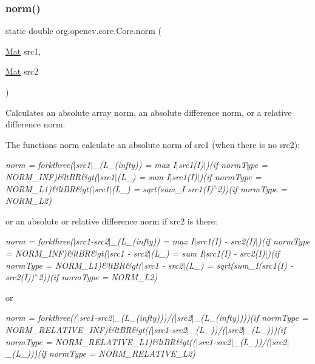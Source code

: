 \subsubsection{\texorpdfstring{norm()}{norm()}\hspace{0.1cm}{\footnotesize\ttfamily [6/6]}}
{\footnotesize\ttfamily static double org.\+opencv.\+core.\+Core.\+norm (\begin{DoxyParamCaption}\item[{\mbox{\hyperlink{classorg_1_1opencv_1_1core_1_1_mat}{Mat}}}]{src1,  }\item[{\mbox{\hyperlink{classorg_1_1opencv_1_1core_1_1_mat}{Mat}}}]{src2 }\end{DoxyParamCaption})\hspace{0.3cm}{\ttfamily [static]}}

Calculates an absolute array norm, an absolute difference norm, or a relative difference norm.

The functions {\ttfamily norm} calculate an absolute norm of {\ttfamily src1} (when there is no {\ttfamily src2})\+:

{\itshape norm = forkthree($\vert$src1$\vert$\+\_\+(L\+\_\+(infty)) = max {\itshape I$\vert$src1(I)$\vert$)(if norm\+Type = N\+O\+R\+M\+\_\+\+I\+NF)\&lt\+BR\&gt($\vert$src1$\vert$}(L\+\_) = sum {\itshape I$\vert$src1(I)$\vert$)(if norm\+Type = N\+O\+R\+M\+\_\+\+L1)\&lt\+BR\&gt($\vert$src1$\vert$}(L\+\_) = sqrt(sum\+\_\+\+I src1(\+I)$^\wedge$2))(if norm\+Type = N\+O\+R\+M\+\_\+\+L2)}

or an absolute or relative difference norm if {\ttfamily src2} is there\+:

{\itshape norm = forkthree($\vert$src1-\/src2$\vert$\+\_\+(L\+\_\+(infty)) = max {\itshape I$\vert$src1(I) -\/ src2(\+I)$\vert$)(if norm\+Type = N\+O\+R\+M\+\_\+\+I\+NF)\&lt\+BR\&gt($\vert$src1 -\/ src2$\vert$}(L\+\_) = sum {\itshape I$\vert$src1(I) -\/ src2(\+I)$\vert$)(if norm\+Type = N\+O\+R\+M\+\_\+\+L1)\&lt\+BR\&gt($\vert$src1 -\/ src2$\vert$}(L\+\_) = sqrt(sum\+\_\+I(src1(\+I) -\/ src2(\+I))$^\wedge$2))(if norm\+Type = N\+O\+R\+M\+\_\+\+L2)}

or

{\itshape norm = forkthree(($\vert$src1-\/src2$\vert$\+\_\+(L\+\_\+(infty)))/($\vert$src2$\vert$\+\_\+(L\+\_\+(infty))))(if norm\+Type = N\+O\+R\+M\+\_\+\+R\+E\+L\+A\+T\+I\+V\+E\+\_\+\+I\+NF)\&lt\+BR\&gt(($\vert$src1-\/src2$\vert$\+\_\+(L\+\_))/($\vert$src2$\vert$\+\_\+(L\+\_)))(if norm\+Type = N\+O\+R\+M\+\_\+\+R\+E\+L\+A\+T\+I\+V\+E\+\_\+\+L1)\&lt\+BR\&gt(($\vert$src1-\/src2$\vert$\+\_\+(L\+\_))/($\vert$src2$\vert$\+\_\+(L\+\_)))(if norm\+Type = N\+O\+R\+M\+\_\+\+R\+E\+L\+A\+T\+I\+V\+E\+\_\+\+L2)}

